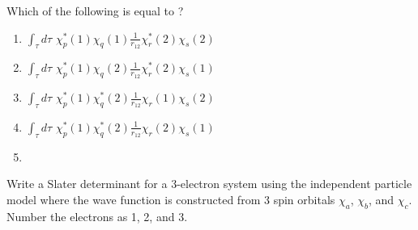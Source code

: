%
\begin{problem1}
Which of the following is equal to ?

\begin{enumerate}[label=(\Alph*)]
  \item $\displaystyle{}\int_\tau{d\tau\,\,\chi^*_p(1)\chi_q(1)\frac{1}{r_{12}}\chi^*_r(2)\chi_s(2)}$
  \item $\displaystyle{}\int_\tau{d\tau\,\,\chi^*_p(1)\chi_q(2)\frac{1}{r_{12}}\chi^*_r(2)\chi_s(1)}$
  \item $\displaystyle{}\int_\tau{d\tau\,\,\chi^*_p(1)\chi^*_q(2)\frac{1}{r_{12}}\chi_r(1)\chi_s(2)}$
  \item $\displaystyle{}\int_\tau{d\tau\,\,\chi^*_p(1)\chi^*_q(2)\frac{1}{r_{12}}\chi_r(2)\chi_s(1)}$
  \item {}
\end{enumerate}
\end{problem1}

%
\begin{problem1}
Write a Slater determinant for a 3-electron system using the independent particle model where the wave function is constructed from 3 spin orbitals $\chi_a$, $\chi_b$, and $\chi_c$. Number the electrons as 1, 2, and 3.

\end{problem1}